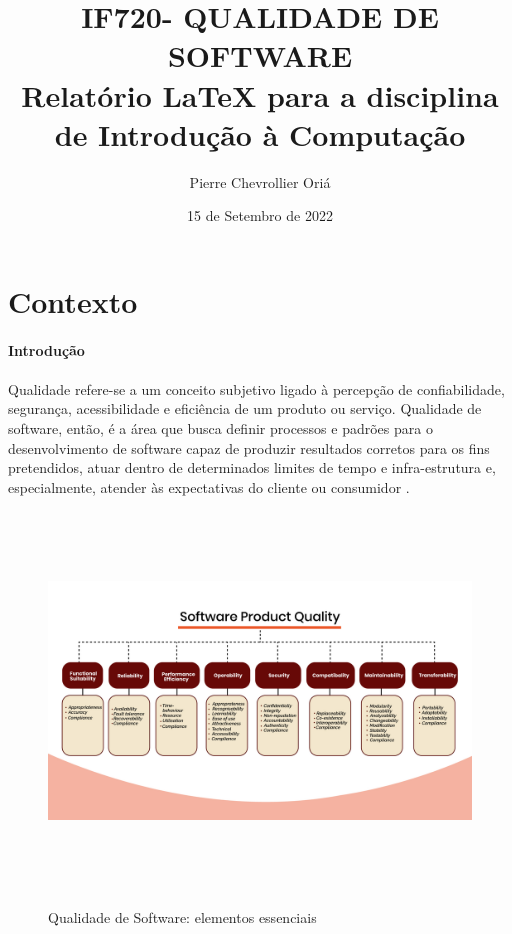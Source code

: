 \documentclass[a4paper, 16pt]{article}
\begin{document}
\title{%
  IF720- QUALIDADE DE SOFTWARE \\
  \large Relatório LaTeX para a disciplina de Introdução à Computação}


\author{Pierre Chevrollier Oriá}

\date{15 de Setembro de 2022}

\maketitle


\pagebreak

\section{Contexto}

\paragraph{Introdução}

\paragraph{}
Qualidade refere-se a um conceito subjetivo ligado à percepção de confiabilidade, segurança, acessibilidade e eficiência de um produto ou serviço. Qualidade de software, então, é a área que busca definir processos e padrões para o desenvolvimento de software capaz de produzir resultados corretos para os fins pretendidos, atuar dentro de determinados limites de tempo e infra-estrutura e, especialmente, atender às expectativas do cliente ou consumidor \cite{amlv}.



\begin{figure}[H]
\includegraphics[width=15cm, height=10cm]{swqlt.jpg}
\centering
\caption{Qualidade de Software: elementos essenciais}
\cite{swq}
\end{figure}
\end{document}
